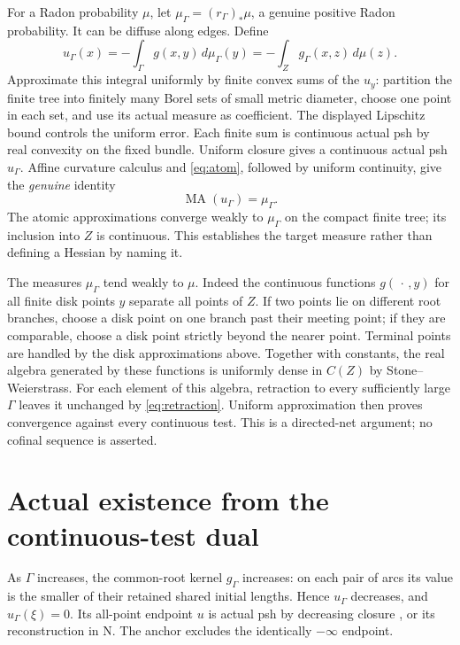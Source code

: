 \documentclass[11pt]{article}
\newcommand{\MA}{\operatorname{MA}}
\begin{document}
For a Radon probability $\mu$, let
$\mu_\Gamma=(r_\Gamma)_*\mu$, a genuine positive Radon
probability. It can be diffuse along edges. Define
\[
 u_\Gamma(x)=-\int_\Gamma g(x,y)\,d\mu_\Gamma(y)
            =-\int_Zg_\Gamma(x,z)\,d\mu(z).
\]
Approximate this integral uniformly by finite convex sums of
the $u_y$: partition the finite tree into finitely many Borel
sets of small metric diameter, choose one point in each set,
and use its actual measure as coefficient. The displayed
Lipschitz bound controls the uniform error. Each finite sum is
continuous actual psh by real convexity on the fixed bundle.
Uniform closure gives a continuous actual psh $u_\Gamma$.
Affine curvature calculus and \eqref{eq:atom}, followed by
uniform continuity, give the \emph{genuine} identity
\begin{equation}\label{eq:GammaMA}
                     \MA(u_\Gamma)=\mu_\Gamma.
\end{equation}
The atomic approximations converge weakly to $\mu_\Gamma$ on
the compact finite tree; its inclusion into $Z$ is continuous.
This establishes the target measure rather than defining a
Hessian by naming it.

The measures $\mu_\Gamma$ tend weakly to $\mu$. Indeed the
continuous functions $g(\,\cdot\,,y)$ for all finite disk points
$y$ separate all points of $Z$. If two points lie on different
root branches, choose a disk point on one branch past their
meeting point; if they are comparable, choose a disk point
strictly beyond the nearer point. Terminal points are handled
by the disk approximations above. Together with constants,
the real algebra generated by these functions is uniformly
dense in $C(Z)$ by Stone--Weierstrass. For each element of this
algebra, retraction to every sufficiently large $\Gamma$ leaves
it unchanged by \eqref{eq:retraction}. Uniform approximation
then proves convergence against every continuous test. This is
a directed-net argument; no cofinal sequence is asserted.

\section{Actual existence from the continuous-test dual}

As $\Gamma$ increases, the common-root kernel $g_\Gamma$
increases: on each pair of arcs its value is the smaller of
their retained shared initial lengths. Hence $u_\Gamma$ decreases,
and $u_\Gamma(\xi)=0$. Its all-point endpoint $u$ is actual psh
by decreasing closure \cite[Corollary 7.5]{BE}, or its
reconstruction in N. The anchor excludes the identically
$-\infty$ endpoint.
\end{document}
